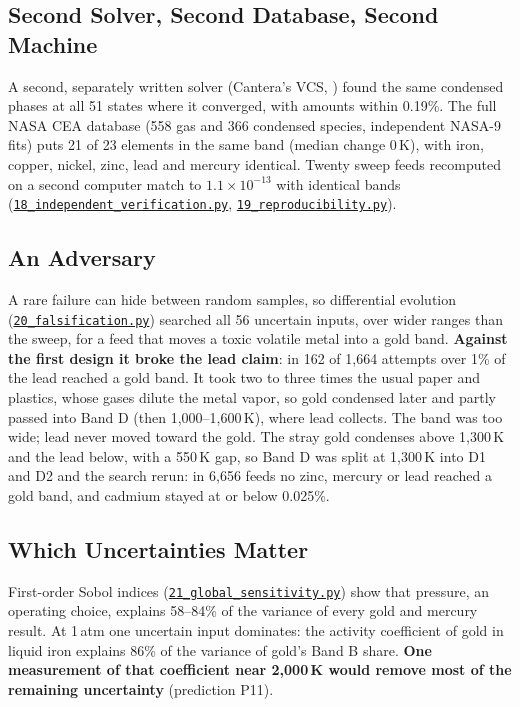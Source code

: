 \documentclass[11pt,a4paper]{article}
\newcommand{\gh}[2]{\href{https://github.com/syncaissa/paramanu-reclaimer/blob/main/#1}{\texttt{#2}}}
\theoremstyle{definition}
\theoremstyle{plain}
\theoremstyle{remark}
\begin{document}
\subsection{Second Solver, Second Database, Second Machine}
A second, separately written solver (Cantera's VCS, \citealp{smithmissen1982}) found the same condensed phases at all 51 states where it converged, with amounts within 0.19\%. The full NASA CEA database (558 gas and 366 condensed species, independent NASA-9 fits) puts 21 of 23 elements in the same band (median change 0\,K), with iron, copper, nickel, zinc, lead and mercury identical. Twenty sweep feeds recomputed on a second computer match to $1.1\times10^{-13}$ with identical bands (\gh{simulation/scripts/18_independent_verification.py}{18\_independent\_verification.py}, \gh{simulation/scripts/19_reproducibility.py}{19\_reproducibility.py}).

\subsection{An Adversary}\label{sec:falsification}
A rare failure can hide between random samples, so differential evolution \citep{storn1997} (\gh{simulation/scripts/20_falsification.py}{20\_falsification.py}) searched all 56 uncertain inputs, over wider ranges than the sweep, for a feed that moves a toxic volatile metal into a gold band. \textbf{Against the first design it broke the lead claim}: in 162 of 1,664 attempts over 1\% of the lead reached a gold band. It took two to three times the usual paper and plastics, whose gases dilute the metal vapor, so gold condensed later and partly passed into Band D (then 1,000--1,600\,K), where lead collects. The band was too wide; lead never moved toward the gold. The stray gold condenses above 1,300\,K and the lead below, with a 550\,K gap, so Band D was split at 1,300\,K into D1 and D2 and the search rerun: in 6,656 feeds no zinc, mercury or lead reached a gold band, and cadmium stayed at or below 0.025\%.

\subsection{Which Uncertainties Matter}\label{sec:sobol}
First-order Sobol indices \citep{sobol2001,plischke2013} (\gh{simulation/scripts/21_global_sensitivity.py}{21\_global\_sensitivity.py}) show that pressure, an operating choice, explains 58--84\% of the variance of every gold and mercury result. At 1\,atm one uncertain input dominates: the activity coefficient of gold in liquid iron explains 86\% of the variance of gold's Band B share. \textbf{One measurement of that coefficient near 2,000\,K would remove most of the remaining uncertainty} (prediction P11).
\end{document}
